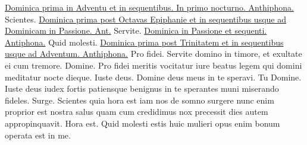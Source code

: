 \newpage


\thispagestyle{fancy}

\begin{multicols*}{2}


\noindent \ul{Dominica prima in Adventu et in sequentibus. In primo nocturno. Anthiphona.}
 Scientes.
\newline \ul{Dominica prima post Octavas Epiphanie et in sequentibus usque ad Dominicam in Passione. Ant.}
 Servite.
\newline \ul{Dominica in Passione et sequenti. Antiphona.}
 Quid molesti.
\newline \ul{Dominica prima post Trinitatem et in sequentibus usque ad Adventum. Anthiphona.}
 Pro fidei.
 Servite domino in timore, et exultate ei cum tremore.
 Domine.
 Pro fidei meritis vocitatur iure beatus legem qui domini meditatur nocte dieque.
 Iuste deus.
 Domine deus meus in te speravi.
 Tu Domine.
 Iuste deus iudex fortis patiensque benignus in te sperantes muni miserando fideles.
 Surge.
 Scientes quia hora est iam nos de somno surgere nunc enim proprior est nostra salus quam cum credidimus nox precessit dies autem appropinquavit.
 Hora est.
 Quid molesti estis huic mulieri opus enim bonum operata est in me.

\end{multicols*}
